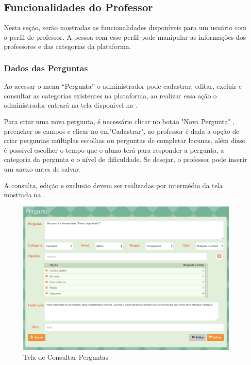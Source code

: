\subsection{Funcionalidades do Professor}
Nesta seção, serão mostradas as funcionalidades disponíveis para um usuário com o perfil de professor. A pessoa com esse perfil pode manipular as informações dos professores e das categorias da plataforma.
\subsubsection{Dados das Perguntas}

Ao acessar o menu “Pergunta” o administrador pode cadastrar, editar, excluir e consultar as categorias existentes na plataforma, ao realizar essa ação o administrador entrará na tela disponível na . 

Para criar uma nova pergunta, é necessário clicar no botão "Nova Pergunta" , preencher os campos e clicar no em"Cadastrar", ao professor é dada a opção de criar perguntas múltiplas escolhas ou perguntas de completar lacunas, além disso é possível escolher o tempo que o aluno terá para responder a pergunta, a categoria da pergunta e o nível de dificuldade. Se desejar, o professor pode inserir um anexo antes de salvar.

A consulta, edição e exclusão devem ser realizadas por intermédio da tela mostrada na .

\begin{figure}[H]
  \centering
  \includegraphics[scale=0.4]{images/proposta-img/Figura4-19.png}
  \caption{Tela de Consultar Perguntas}
  \label{fig:Figura4-19}
\end{figure}

